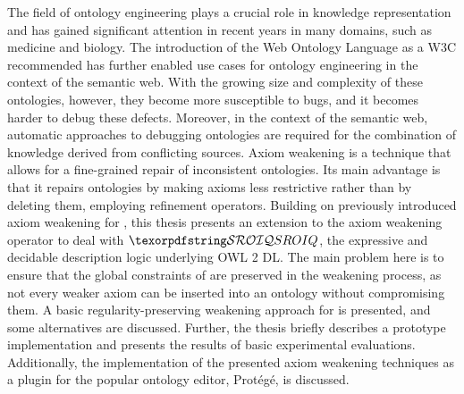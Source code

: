 The field of ontology engineering plays a crucial role in knowledge representation and has gained significant attention in recent years in many domains, such as medicine and biology. The introduction of the Web Ontology Language as a W3C recommended has further enabled use cases for ontology engineering in the context of the semantic web. With the growing size and complexity of these ontologies, however, they become more susceptible to bugs, and it becomes harder to debug these defects. Moreover, in the context of the semantic web, automatic approaches to debugging ontologies are required for the combination of knowledge derived from conflicting sources. Axiom weakening is a technique that allows for a fine-grained repair of inconsistent ontologies. Its main advantage is that it repairs ontologies by making axioms less restrictive rather than by deleting them, employing refinement operators. Building on previously introduced axiom weakening for \ALC, this thesis presents an extension to the axiom weakening operator to deal with $\SROIQ$, the expressive and decidable description logic underlying OWL 2 DL. The main problem here is to ensure that the global constraints of \SROIQ are preserved in the weakening process, as not every weaker axiom can be inserted into an ontology without compromising them. A basic regularity-preserving weakening approach for \SROIQ is presented, and some alternatives are discussed. Further, the thesis briefly describes a prototype implementation and presents the results of basic experimental evaluations. Additionally, the implementation of the presented axiom weakening techniques as a plugin for the popular ontology editor, Protégé, is discussed.
